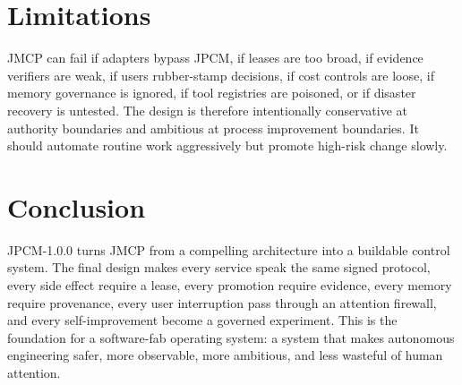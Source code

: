 \documentclass[10pt,journal,onecolumn]{IEEEtran}
\begin{document}
\section{Limitations}
JMCP can fail if adapters bypass JPCM, if leases are too broad, if evidence verifiers are weak, if users rubber-stamp decisions, if cost controls are loose, if memory governance is ignored, if tool registries are poisoned, or if disaster recovery is untested. The design is therefore intentionally conservative at authority boundaries and ambitious at process improvement boundaries. It should automate routine work aggressively but promote high-risk change slowly.

\section{Conclusion}
JPCM-1.0.0 turns JMCP from a compelling architecture into a buildable control system. The final design makes every service speak the same signed protocol, every side effect require a lease, every promotion require evidence, every memory require provenance, every user interruption pass through an attention firewall, and every self-improvement become a governed experiment. This is the foundation for a software-fab operating system: a system that makes autonomous engineering safer, more observable, more ambitious, and less wasteful of human attention.
\end{document}
